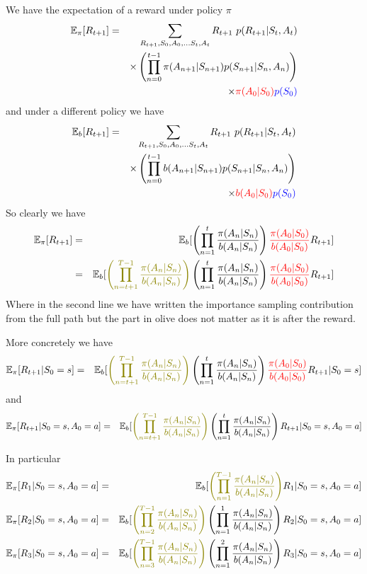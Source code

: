 \documentclass[11pt,a4paper]{article}
\newcommand\bea{\begin{eqnarray}}
\newcommand\eea{\end{eqnarray}}
\newcommand{\nn}{\nonumber \\}
\begin{document}
We have the expectation of a reward under policy $\pi$ 
\bea
\mathbb E_{\pi}[R_{t+1}] &=& \sum_{R_{t+1}, S_0,A_0, \dots S_{t}, A_{t}} R_{t+1} ~ p(R_{t+1}| S_{t},A_{t}) \nn
&& \times \left( \prod_{n=0}^{t-1} \pi(A_{n+1} | S_{n+1} ) p( S_{n+1} | S_{n}, A_{n}) \right) \nn
&&\times \color{red}{\pi(A_0|S_0)} \color{blue}{p(S_0)} 
\eea
and under a different policy we have
\bea
\mathbb E_{b}[R_{t+1}] &=& \sum_{R_{t+1}, S_0,A_0, \dots S_{t}, A_{t}} R_{t+1} ~ p(R_{t+1}| S_{t},A_{t}) \nn
&& \times \left( \prod_{n=0}^{t-1} b(A_{n+1} | S_{n+1} ) p( S_{n+1} | S_{n}, A_{n}) \right) \nn
&&\times \color{red}{b(A_0|S_0)} \color{blue}{p(S_0)} 
\eea
So clearly we have
\bea
\mathbb E_{\pi}[R_{t+1}] &=& \mathbb E_{b}[ \left( \prod_{n=1}^{t} \frac{\pi(A_{n} | S_{n} )}{b(A_{n} | S_{n} )} \right) {\color{red}\frac{\pi(A_{0} | S_{0} )}{b(A_{0} | S_{0} )}}   R_{t+1}]  \nn
&=&  \mathbb E_{b}[ {\color{olive} \left( \prod_{n=t+1}^{T-1} \frac{\pi(A_{n} | S_{n} )}{b(A_{n} | S_{n} )} \right)} \left( \prod_{n=1}^{t} \frac{\pi(A_{n} | S_{n} )}{b(A_{n} | S_{n} )} \right) {\color{red}\frac{\pi(A_{0} | S_{0} )}{b(A_{0} | S_{0} )}}   R_{t+1}]  \nn
\eea
Where in the second line we have written the importance sampling contribution from the full path but the part in olive does not matter as it is after the reward. 

More concretely we have
\bea
 \mathbb E_\pi[R_{t+1} | S_0=s] &=& \mathbb E_{b}[ {\color{olive} \left( \prod_{n=t+1}^{T-1} \frac{\pi(A_{n} | S_{n} )}{b(A_{n} | S_{n} )} \right)} \left( \prod_{n=1}^{t} \frac{\pi(A_{n} | S_{n} )}{b(A_{n} | S_{n} )} \right) {\color{red}\frac{\pi(A_{0} | S_{0} )}{b(A_{0} | S_{0} )}}   R_{t+1}|S_0 = s] \nn
\eea
and
\bea
\mathbb E_\pi[R_{t+1} | S_0=s,A_0=a] &=& \mathbb E_{b}[ {\color{olive} \left( \prod_{n=t+1}^{T-1} \frac{\pi(A_{n} | S_{n} )}{b(A_{n} | S_{n} )} \right)} \left( \prod_{n=1}^{t} \frac{\pi(A_{n} | S_{n} )}{b(A_{n} | S_{n} )} \right)    R_{t+1}|S_0 = s,A_0=a] \nn
\eea


In particular
\bea
\mathbb E_\pi[R_{1} | S_0=s,A_0=a] &=& \mathbb E_{b}[ {\color{olive} \left( \prod_{n=1}^{T-1} \frac{\pi(A_{n} | S_{n} )}{b(A_{n} | S_{n} )} \right)}   R_{1}|S_0 = s,A_0=a] \nn
\mathbb E_\pi[R_{2} | S_0=s,A_0=a] &=& \mathbb E_{b}[ {\color{olive} \left( \prod_{n=2}^{T-1} \frac{\pi(A_{n} | S_{n} )}{b(A_{n} | S_{n} )} \right)} \left( \prod_{n=1}^{1} \frac{\pi(A_{n} | S_{n} )}{b(A_{n} | S_{n} )} \right)    R_{2}|S_0 = s,A_0=a] \nn
\mathbb E_\pi[R_{3} | S_0=s,A_0=a] &=& \mathbb E_{b}[ {\color{olive} \left( \prod_{n=3}^{T-1} \frac{\pi(A_{n} | S_{n} )}{b(A_{n} | S_{n} )} \right)} \left( \prod_{n=1}^{2} \frac{\pi(A_{n} | S_{n} )}{b(A_{n} | S_{n} )} \right)    R_{3}|S_0 = s,A_0=a] \nn
\eea
\end{document}
